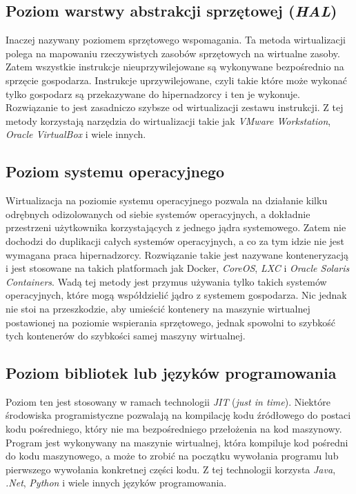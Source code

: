 \documentclass[polish, a4paper, 12pt, oneside]{book}
\begin{document}
	\subsection {Poziom warstwy abstrakcji sprzętowej (\textit{HAL})}
	Inaczej nazywany poziomem sprzętowego wspomagania. Ta metoda wirtualizacji polega na mapowaniu rzeczywistych zasobów sprzętowych na wirtualne zasoby. Zatem wszystkie instrukcje nieuprzywilejowane są wykonywane bezpośrednio na sprzęcie gospodarza. Instrukcje uprzywilejowane, czyli takie które może wykonać tylko gospodarz są przekazywane do hipernadzorcy i ten je wykonuje. Rozwiązanie to jest zasadniczo szybsze od wirtualizacji zestawu instrukcji. Z tej metody korzystają narzędzia do wirtualizacji takie jak \textit{VMware Workstation}\cite{vmwareworkstation}, \textit{Oracle VirtualBox}\cite{virtualbox} i wiele innych.
	\subsection {Poziom systemu operacyjnego}
	Wirtualizacja na poziomie systemu operacyjnego pozwala na działanie kilku odrębnych odizolowanych od siebie systemów operacyjnych, a dokładnie przestrzeni użytkownika korzystających z jednego jądra systemowego. Zatem nie dochodzi do duplikacji całych systemów operacyjnych, a co za tym idzie nie jest wymagana praca hipernadzorcy. Rozwiązanie takie jest nazywane konteneryzacją i jest stosowane na takich platformach jak Docker, \textit{CoreOS}\cite{coreos}, \textit{LXC}\cite{lxc} i \textit{Oracle Solaris Containers}\cite{solaris}. Wadą tej metody jest przymus używania tylko takich systemów operacyjnych, które mogą współdzielić jądro z systemem gospodarza. Nic jednak nie stoi na przeszkodzie, aby umieścić kontenery na maszynie wirtualnej postawionej na poziomie wspierania sprzętowego, jednak spowolni to szybkość tych kontenerów do szybkości samej maszyny wirtualnej. 
	\subsection {Poziom bibliotek lub języków programowania}
	Poziom ten jest stosowany w ramach technologii \textit{JIT} (\textit{just in time}). Niektóre środowiska programistyczne pozwalają na kompilację kodu źródłowego do postaci kodu pośredniego, który nie ma bezpośredniego przełożenia na kod maszynowy. Program jest wykonywany na maszynie wirtualnej, która kompiluje kod pośredni do kodu maszynowego, a może to zrobić na początku wywołania programu lub pierwszego wywołania konkretnej części kodu. Z tej technologii korzysta \textit{Java}\cite{java}, \textit{.Net}\cite{dotnet}, \textit{Python}\cite{python} i wiele innych języków programowania. 
\end{document}
